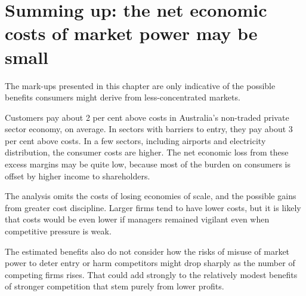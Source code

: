 


\section{Summing up: the net economic costs of market power may be small}

The mark-ups presented in this chapter are only indicative of the possible benefits consumers might derive from less-concentrated markets.

Customers pay about 2 per cent above costs in Australia's non-traded private sector economy, on average. In sectors with barriers to entry, they pay about 3 per cent above costs. In a few sectors, including airports and electricity distribution, the consumer costs are higher. The net economic loss from these excess margins may be quite low, because most of the burden on consumers is offset by higher income to shareholders. 

The analysis omits the costs of losing economies of scale, and the possible gains from greater cost discipline. Larger firms tend to have lower costs, but it is likely that costs would be even lower if managers remained vigilant even when competitive pressure is weak.

The estimated benefits also do not consider how the risks of misuse of market power to deter entry or harm competitors might drop sharply as the number of competing firms rises. That could add strongly to the relatively modest benefits of stronger competition that stem purely from lower profits.



